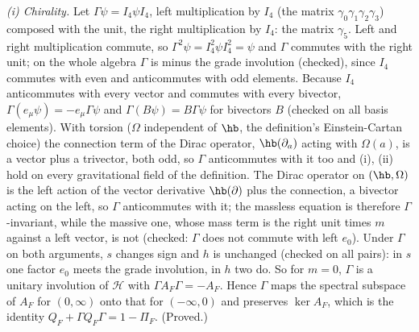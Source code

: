 \emph{(i) Chirality.} Let $\Gamma\psi = I_{4}\psi I_{4}$, left multiplication by $I_{4}$ (the matrix $\gamma_{0}\gamma_{1}\gamma_{2}\gamma_{3}$) composed with the unit, the right multiplication by $I_{4}$: the matrix $\gamma_{5}$. Left and right multiplication commute, so $\Gamma^{2}\psi = I_{4}^{2}\psi I_{4}^{2} = \psi$ and $\Gamma$ commutes with the right unit; on the whole algebra $\Gamma$ is minus the grade involution (checked), since $I_{4}$ commutes with even and anticommutes with odd elements. Because $I_{4}$ anticommutes with every vector and commutes with every bivector, $\Gamma(e_{\mu}\psi) = -e_{\mu}\Gamma\psi$ and $\Gamma(B\psi) = B\Gamma\psi$ for bivectors $B$ (checked on all basis elements). With torsion ($\Omega$ independent of $\hb$, the definition's Einstein-Cartan choice) the connection term of the Dirac operator, $\hb(\partial_{a})$ acting with $\Omega(a)$, is a vector plus a trivector, both odd, so $\Gamma$ anticommutes with it too and (i), (ii) hold on every gravitational field of the definition. The Dirac operator on $(\hb, \Omega)$ is the left action of the vector derivative $\hb(\partial)$ plus the connection, a bivector acting on the left, so $\Gamma$ anticommutes with it; the massless equation is therefore $\Gamma$-invariant, while the massive one, whose mass term is the right unit times $m$ against a left vector, is not (checked: $\Gamma$ does not commute with left $e_{0}$). Under $\Gamma$ on both arguments, $s$ changes sign and $h$ is unchanged (checked on all pairs): in $s$ one factor $e_{0}$ meets the grade involution, in $h$ two do. So for $m = 0$, $\Gamma$ is a unitary involution of $\mathcal{H}$ with $\Gamma A_{F}\Gamma = -A_{F}$. Hence $\Gamma$ maps the spectral subspace of $A_{F}$ for $(0, \infty)$ onto that for $(-\infty, 0)$ and preserves $\ker A_{F}$, which is the identity $Q_{F} + \Gamma Q_{F}\Gamma = 1 - \Pi_{F}$. (Proved.)

